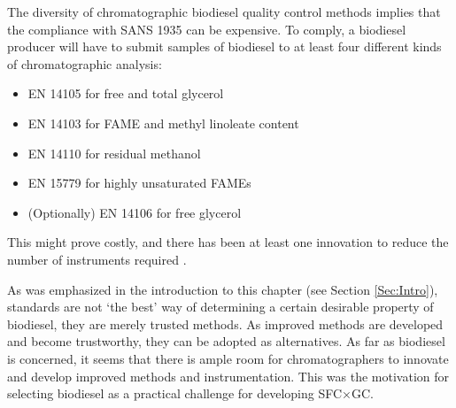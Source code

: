 The diversity of chromatographic biodiesel quality control methods implies that the
compliance with SANS 1935 can be expensive. To comply, a biodiesel producer will
have to submit samples of biodiesel to at least four different kinds of
chromatographic analysis:

\begin{itemize}
  \item EN 14105 for free and total glycerol
  \item EN 14103 for FAME and methyl linoleate content
  \item EN 14110 for residual methanol 
  \item EN 15779 for highly unsaturated FAMEs
  \item (Optionally) EN 14106 for free glycerol
\end{itemize}

This might prove costly, and there has been at least one innovation to reduce
the number of instruments required \autocite{McCurry2009}.

As was emphasized in the introduction to this chapter (see Section
\ref{Sec:Intro}), standards are not `the best' way of determining a certain
desirable property of biodiesel, they are merely trusted methods. As improved
methods are developed and become trustworthy, they can be adopted as
alternatives. As far as biodiesel is concerned, it seems that there is ample
room for chromatographers to innovate and develop improved methods and
instrumentation. This was the motivation for selecting biodiesel as a practical
challenge for developing SFC×GC.


